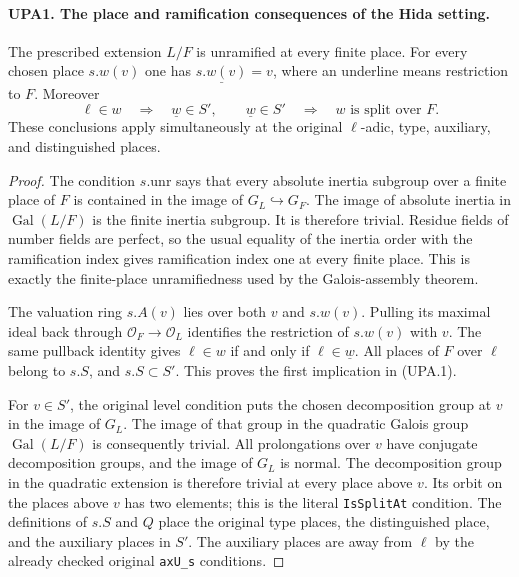 \paragraph{UPA1. The place and ramification consequences of the Hida setting.}
\label{claim:UPA1}
The prescribed extension $L/F$ is unramified at every finite place.
For every chosen place $s.w(v)$ one has
$\underline{s.w(v)}=v$, where an underline means restriction to $F$.
Moreover
\[
 \ell\in w\quad\Longrightarrow\quad \underline w\in S',
 \qquad
 \underline w\in S'\quad\Longrightarrow\quad w\text{ is split over }F.
 \tag{UPA.1}
\]
These conclusions apply simultaneously at the original $\ell$-adic,
type, auxiliary, and distinguished places.
\begin{proof}
The condition $s.\mathrm{unr}$ says that every absolute inertia subgroup
over a finite place of $F$ is contained in the image of
$G_L\hookrightarrow G_F$.  The image of absolute inertia in
$\operatorname{Gal}(L/F)$ is the finite inertia subgroup.  It is
therefore trivial.  Residue fields of number fields are perfect, so
the usual equality of the inertia order with the ramification index
gives ramification index one at every finite place.  This is exactly
the finite-place unramifiedness used by the Galois-assembly theorem.

The valuation ring $s.A(v)$ lies over both $v$ and $s.w(v)$.
Pulling its maximal ideal back through
$\mathcal O_F\longrightarrow\mathcal O_L$ identifies the restriction
of $s.w(v)$ with $v$.  The same pullback identity gives
$\ell\in w$ if and only if $\ell\in\underline w$.
All places of $F$ over $\ell$ belong to $s.S$, and $s.S\subset S'$.
This proves the first implication in (UPA.1).

For $v\in S'$, the original level condition puts the chosen
decomposition group at $v$ in the image of $G_L$.
The image of that group in the quadratic Galois group
$\operatorname{Gal}(L/F)$ is consequently trivial.  All prolongations
over $v$ have conjugate decomposition groups, and the image of $G_L$
is normal.  The decomposition group in the quadratic extension is
therefore trivial at every place above $v$.  Its orbit on the places
above $v$ has two elements; this is the literal \texttt{IsSplitAt}
condition.  The definitions of $s.S$ and $Q$ place the original type
places, the distinguished place, and the auxiliary places in $S'$.
The auxiliary places are away from $\ell$ by the already checked
original \texttt{axU\_s} conditions.
\end{proof}

